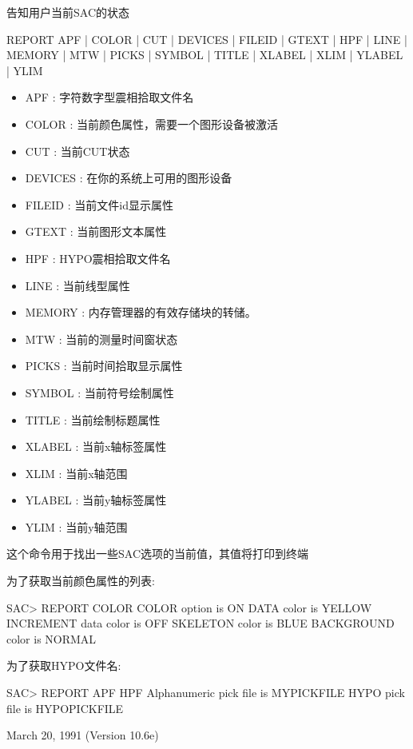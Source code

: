 \label{cmd:report}

告知用户当前SAC的状态

REPORT APF | COLOR | CUT | DEVICES | FILEID | GTEXT | HPF | LINE | MEMORY |  MTW | PICKS | SYMBOL | TITLE | XLABEL | XLIM | YLABEL | YLIM  

\begin{itemize}
\item APF : 字符数字型震相拾取文件名 
\item COLOR : 当前颜色属性，需要一个图形设备被激活 
\item CUT : 当前CUT状态 
\item DEVICES : 在你的系统上可用的图形设备 
\item FILEID : 当前文件id显示属性 
\item GTEXT : 当前图形文本属性 
\item HPF : HYPO震相拾取文件名 
\item LINE : 当前线型属性 
\item MEMORY : 内存管理器的有效存储块的转储。 
\item MTW : 当前的测量时间窗状态 
\item PICKS : 当前时间拾取显示属性 
\item SYMBOL : 当前符号绘制属性 
\item TITLE : 当前绘制标题属性 
\item XLABEL : 当前x轴标签属性 
\item XLIM : 当前x轴范围 
\item YLABEL : 当前y轴标签属性 
\item YLIM : 当前y轴范围 
\end{itemize} 

这个命令用于找出一些SAC选项的当前值，其值将打印到终端

为了获取当前颜色属性的列表:
\begin{SACCode}
SAC> REPORT COLOR
 COLOR option is ON
 DATA color is YELLOW
 INCREMENT data color is OFF
 SKELETON color is BLUE
 BACKGROUND color is NORMAL
\end{SACCode}

为了获取HYPO文件名:
\begin{SACCode}
SAC> REPORT APF HPF
 Alphanumeric pick file is MYPICKFILE
 HYPO pick file is HYPOPICKFILE
\end{SACCode}

March 20, 1991 (Version 10.6e)
